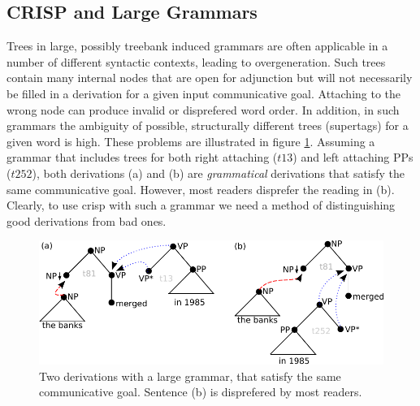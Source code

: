 \subsection{CRISP and Large Grammars}
Trees in large, possibly treebank induced grammars are often applicable in a number of different syntactic contexts, leading to overgeneration. Such trees contain many internal nodes that are open for adjunction but will not necessarily be filled in a derivation for a given input communicative goal. Attaching to the wrong node can produce invalid or disprefered word order. 
In addition, in such grammars the ambiguity of possible, structurally different trees (supertags) for a given word is high. These problems are illustrated in figure \ref{fig:overgen}. Assuming a grammar that includes trees for both right attaching ($t13$) and left attaching PPs ($t252$), both derivations (a) and (b) are {\it grammatical} derivations that satisfy the same communicative goal. However, most readers disprefer the reading in (b). 
Clearly, to use {\sc crisp} with such a grammar we need a method of distinguishing good derivations from bad ones. 
\begin{figure}
\begin{center}
\includegraphics[width=.6\textwidth]{figures/overgen.pdf}
\caption{\label{fig:overgen} Two derivations with a large grammar, that satisfy the same communicative goal. Sentence (b) is disprefered by most readers.}
\end{center}
\end{figure} 

